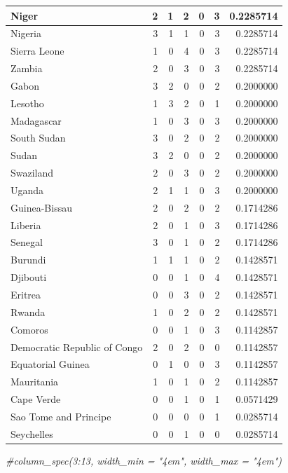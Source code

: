 \documentclass[
  12pt,
]{article}
\newenvironment{Shaded}{\begin{snugshade}}{\end{snugshade}}
\newcommand{\CommentTok}[1]{\textcolor[rgb]{0.56,0.35,0.01}{\textit{#1}}}
\begin{document}
\begin{table}
\begin{tabular}[t]{l|r|r|r|r|r|r}
\hline
Niger & 2 & 1 & 2 & 0 & 3 & 0.2285714\\
\hline
Nigeria & 3 & 1 & 1 & 0 & 3 & 0.2285714\\
\hline
Sierra Leone & 1 & 0 & 4 & 0 & 3 & 0.2285714\\
\hline
Zambia & 2 & 0 & 3 & 0 & 3 & 0.2285714\\
\hline
Gabon & 3 & 2 & 0 & 0 & 2 & 0.2000000\\
\hline
Lesotho & 1 & 3 & 2 & 0 & 1 & 0.2000000\\
\hline
Madagascar & 1 & 0 & 3 & 0 & 3 & 0.2000000\\
\hline
South Sudan & 3 & 0 & 2 & 0 & 2 & 0.2000000\\
\hline
Sudan & 3 & 2 & 0 & 0 & 2 & 0.2000000\\
\hline
Swaziland & 2 & 0 & 3 & 0 & 2 & 0.2000000\\
\hline
Uganda & 2 & 1 & 1 & 0 & 3 & 0.2000000\\
\hline
Guinea-Bissau & 2 & 0 & 2 & 0 & 2 & 0.1714286\\
\hline
Liberia & 2 & 0 & 1 & 0 & 3 & 0.1714286\\
\hline
Senegal & 3 & 0 & 1 & 0 & 2 & 0.1714286\\
\hline
Burundi & 1 & 1 & 1 & 0 & 2 & 0.1428571\\
\hline
Djibouti & 0 & 0 & 1 & 0 & 4 & 0.1428571\\
\hline
Eritrea & 0 & 0 & 3 & 0 & 2 & 0.1428571\\
\hline
Rwanda & 1 & 0 & 2 & 0 & 2 & 0.1428571\\
\hline
Comoros & 0 & 0 & 1 & 0 & 3 & 0.1142857\\
\hline
Democratic Republic of Congo & 2 & 0 & 2 & 0 & 0 & 0.1142857\\
\hline
Equatorial Guinea & 0 & 1 & 0 & 0 & 3 & 0.1142857\\
\hline
Mauritania & 1 & 0 & 1 & 0 & 2 & 0.1142857\\
\hline
Cape Verde & 0 & 0 & 1 & 0 & 1 & 0.0571429\\
\hline
Sao Tome and Principe & 0 & 0 & 0 & 0 & 1 & 0.0285714\\
\hline
Seychelles & 0 & 0 & 1 & 0 & 0 & 0.0285714\\
\hline
\end{tabular}
\end{table}

\begin{Shaded}
\begin{Highlighting}[]
  \CommentTok{#column_spec(3:13, width_min = "4em", width_max = "4em")}
\end{Highlighting}
\end{Shaded}
\end{document}
